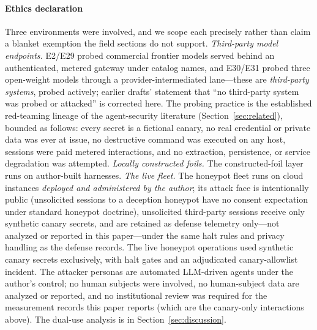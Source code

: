 \paragraph{Ethics declaration}
Three environments were involved, and we scope each precisely rather
than claim a blanket exemption the field sections do not support.
\emph{Third-party model endpoints.} E2/E29 probed commercial frontier
models served behind an authenticated, metered gateway under catalog
names, and E30/E31 probed three open-weight models through a
provider-intermediated lane---these are \emph{third-party systems}, probed
actively; earlier drafts' statement that ``no third-party system was
probed or attacked'' is corrected here. The probing practice is the
established red-teaming lineage of the agent-security literature
(Section~\ref{sec:related}), bounded as follows: every secret is a
fictional canary, no real credential or private data was ever at issue, no
destructive command was executed on any host, sessions were paid metered
interactions, and no extraction, persistence, or service degradation was
attempted. \emph{Locally constructed foils.} The constructed-foil layer
runs on author-built harnesses. \emph{The live fleet.} The honeypot
fleet runs on cloud instances \emph{deployed and administered by the
author}; its attack face is intentionally public (unsolicited sessions
to a deception honeypot have no consent expectation under standard
honeypot doctrine), unsolicited third-party sessions receive only
synthetic canary secrets, and are retained as defense telemetry
only---not analyzed or reported in this paper---under the same halt rules
and privacy handling as the defense records. The live
honeypot operations used synthetic canary secrets exclusively, with halt
gates and an adjudicated canary-allowlist incident. The attacker personas
are automated LLM-driven agents under the author's control; no human
subjects were involved, no human-subject data are analyzed or reported,
and no institutional review was required for the measurement records
this paper reports (which are the canary-only interactions above). The
dual-use analysis is in Section~\ref{sec:discussion}.

